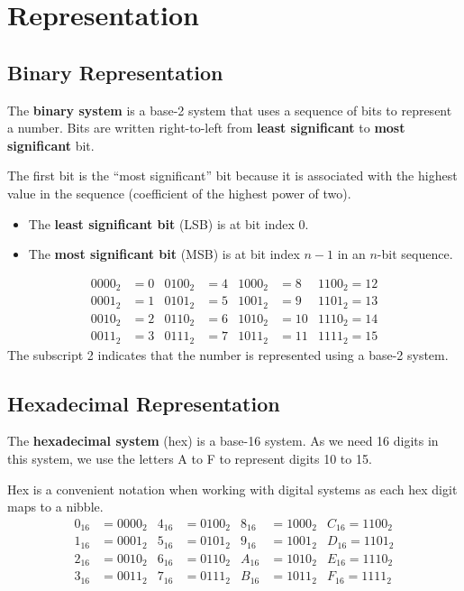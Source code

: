 \documentclass{report}
\begin{document}
\section{Representation}
\subsection{Binary Representation}
The \textbf{binary system} is a base-2 system that uses a sequence of bits to represent a number.
Bits are written right-to-left from \textbf{least significant} to \textbf{most significant} bit.

The first bit is the ``most significant'' bit because it is associated with the highest value in the sequence (coefficient of the highest power of two).
\begin{itemize}
    \item The \textbf{least significant bit} (LSB) is at bit index 0.
    \item The \textbf{most significant bit} (MSB) is at bit index \(n - 1\) in an \(n\)-bit sequence.
\end{itemize}
\begin{align*}
    0000_2 & = 0 & 0100_2 & = 4 & 1000_2 & = 8  & 1100_2 = 12 \\
    0001_2 & = 1 & 0101_2 & = 5 & 1001_2 & = 9  & 1101_2 = 13 \\
    0010_2 & = 2 & 0110_2 & = 6 & 1010_2 & = 10 & 1110_2 = 14 \\
    0011_2 & = 3 & 0111_2 & = 7 & 1011_2 & = 11 & 1111_2 = 15
\end{align*}
The subscript 2 indicates that the number is represented using a base-2 system.
\subsection{Hexadecimal Representation}
The \textbf{hexadecimal system} (hex) is a base-16 system. As we need 16 digits in this system, we use the letters A to F to represent digits 10 to 15.

Hex is a convenient notation when working with digital systems as each hex digit maps to a nibble.
\begin{align*}
    0_{16} & = 0000_2 & 4_{16} & = 0100_2 & 8_{16} & = 1000_2 & C_{16} = 1100_2 \\
    1_{16} & = 0001_2 & 5_{16} & = 0101_2 & 9_{16} & = 1001_2 & D_{16} = 1101_2 \\
    2_{16} & = 0010_2 & 6_{16} & = 0110_2 & A_{16} & = 1010_2 & E_{16} = 1110_2 \\
    3_{16} & = 0011_2 & 7_{16} & = 0111_2 & B_{16} & = 1011_2 & F_{16} = 1111_2
\end{align*}
\end{document}

